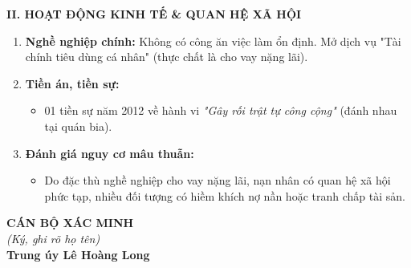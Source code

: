 \documentclass[12pt,a4paper]{article}
\begin{document}
\vspace{0.3cm}\noindent\textbf{\large II. HOẠT ĐỘNG KINH TẾ \& QUAN HỆ XÃ HỘI}\\[0.15cm]

\begin{enumerate}[label=\arabic*., leftmargin=*, itemsep=2pt, topsep=2pt, parsep=0pt]
  \item \textbf{Nghề nghiệp chính:} Không có công ăn việc làm ổn định. Mở dịch vụ "Tài chính tiêu dùng cá nhân" (thực chất là cho vay nặng lãi).
  \item \textbf{Tiền án, tiền sự:}
\begin{itemize}[leftmargin=*, itemsep=2pt, topsep=2pt, parsep=0pt]
  \item 01 tiền sự năm 2012 về hành vi \textit{"Gây rối trật tự công cộng"} (đánh nhau tại quán bia).
\end{itemize}
  \item \textbf{Đánh giá nguy cơ mâu thuẫn:}
\begin{itemize}[leftmargin=*, itemsep=2pt, topsep=2pt, parsep=0pt]
  \item Do đặc thù nghề nghiệp cho vay nặng lãi, nạn nhân có quan hệ xã hội phức tạp, nhiều đối tượng có hiềm khích nợ nần hoặc tranh chấp tài sản.
\end{itemize}
\end{enumerate}
\vspace{0.8cm}
\noindent
\hfill
\begin{minipage}[t]{0.50\textwidth}
    \begin{center}
        \textbf{CÁN BỘ XÁC MINH}\\[0.1cm]
        \textit{(Ký, ghi rõ họ tên)}\\[1.6cm]
        \textbf{Trung úy Lê Hoàng Long}
    \end{center}
\end{minipage}
\end{document}
